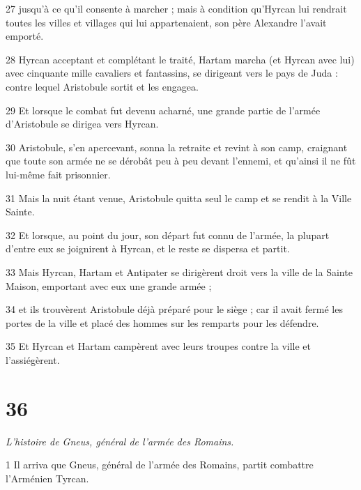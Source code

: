 \par 27 jusqu'à ce qu'il consente à marcher ; mais à condition qu'Hyrcan lui rendrait toutes les villes et villages qui lui appartenaient, son père Alexandre l'avait emporté.

\par 28 Hyrcan acceptant et complétant le traité, Hartam marcha (et Hyrcan avec lui) avec cinquante mille cavaliers et fantassins, se dirigeant vers le pays de Juda : contre lequel Aristobule sortit et les engagea.

\par 29 Et lorsque le combat fut devenu acharné, une grande partie de l'armée d'Aristobule se dirigea vers Hyrcan.

\par 30 Aristobule, s'en apercevant, sonna la retraite et revint à son camp, craignant que toute son armée ne se dérobât peu à peu devant l'ennemi, et qu'ainsi il ne fût lui-même fait prisonnier.

\par 31 Mais la nuit étant venue, Aristobule quitta seul le camp et se rendit à la Ville Sainte.

\par 32 Et lorsque, au point du jour, son départ fut connu de l'armée, la plupart d'entre eux se joignirent à Hyrcan, et le reste se dispersa et partit.

\par 33 Mais Hyrcan, Hartam et Antipater se dirigèrent droit vers la ville de la Sainte Maison, emportant avec eux une grande armée ;

\par 34 et ils trouvèrent Aristobule déjà préparé pour le siège ; car il avait fermé les portes de la ville et placé des hommes sur les remparts pour les défendre.

\par 35 Et Hyrcan et Hartam campèrent avec leurs troupes contre la ville et l'assiégèrent.


\chapter{36}

\par \textit{L'histoire de Gneus, général de l'armée des Romains.}

\par 1 Il arriva que Gneus, général de l'armée des Romains, partit combattre l'Arménien Tyrcan.

